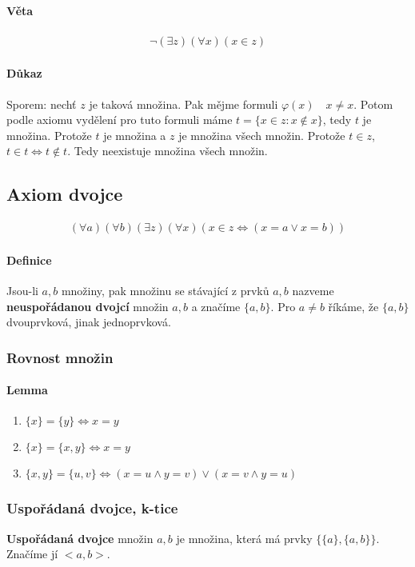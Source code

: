 \documentclass[a4paper,12pt,titlepage]{article}
\begin{document}
\paragraph{Věta}
\begin{align}
	\neg ( \exists z) (\forall x) (x \in z)
\end{align}
\paragraph{Důkaz}
Sporem: nechť $z$ je taková množina. Pak mějme formuli $\varphi(x) \quad x \neq
x$. Potom podle axiomu vydělení pro tuto formuli máme $t = \{x \in z : x \nin x
\}$, tedy $t$ je množina. Protože $t$ je množina a $z$ je množina všech množin.
Protože $t \in z$, $t \in t \Leftrightarrow t \nin t$. Tedy neexistuje množina
všech množin.

\subsection{Axiom dvojce}
\setcounter{equation}{0}
\begin{align}
	(\forall a) (\forall b) (\exists z) (\forall x) ( x \in z \Leftrightarrow (x
	= a \lor x = b ))
\end{align}
\paragraph{Definice}
Jsou-li $a, b$ množiny, pak množinu se stávající z prvků $a,b$ nazveme
\textbf{neuspořádanou dvojcí} množin $a,b$ a značíme $\{a,b\}$. Pro $a\neq b$
říkáme, že $\{a,b\}$ dvouprvková, jinak jednoprvková.

\subsubsection{Rovnost množin}
\setcounter{equation}{0}
\paragraph{Lemma}
\begin{enumerate}
	\item $\{x\} = \{y\} \Leftrightarrow x = y$
	\item $\{x\} = \{x,y\} \Leftrightarrow x = y$
	\item $\{x,y\} = \{u,v\} \Leftrightarrow (x = u \land y = v) \lor (x = v
	\land y = u)$
\end{enumerate}

\subsubsection{Uspořádaná dvojce, k-tice}
\setcounter{equation}{0}
\textbf{Uspořádaná dvojce} množin $a,b$ je množina, která má prvky $\{\{a\}, \{a,b\}\}$.
Značíme jí $<a,b>$.
\end{document}
